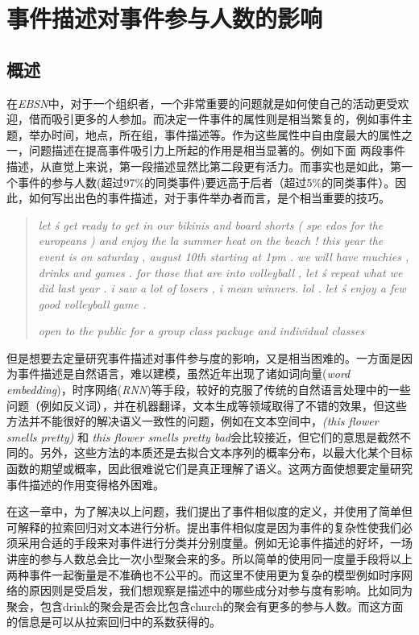 
%    
\section{事件描述对事件参与人数的影响} 
\subsection{概述}  
在\textit{EBSN}中，对于一个组织者，一个非常重要的问题就是如何使自己的活动更受欢迎，借而吸引更多的人参加。而决定一件事件的属性则是相当繁复的，例如事件主题，举办时间，地点，所在组，事件描述等。作为这些属性中自由度最大的属性之一，问题描述在提高事件吸引力上所起的作用是相当显著的。例如下面
两段事件描述，从直觉上来说，第一段描述显然比第二段更有活力。而事实也是如此，第一
个事件的参与人数(超过97\%的同类事件)要远高于后者（超过5\%的同类事件）。因此，如何写出出色的事件描述，对于事件举办者而言，是个相当重要的技巧。
 
\begin{quotation}
  \textit{let  \'s get ready to get in our bikinis and board shorts  (  spe
  edos for the europeans  )  and enjoy the la summer heat on the beach
  !  this year the event is on saturday  ,  august 10th starting at 
  1pm . we will have muchies  ,  drinks and games . for those that 
  are into volleyball  ,  let  \'s repeat what we did last year . 
  i saw a lot of losers  ,  i mean winners. lol . let  \'s enjoy 
  a few good volleyball game . \\ 
  }
    
  \textit{open to the public for a group class package and individual classes}
\end{quotation}

但是想要去定量研究事件描述对事件参与度的影响，又是相当困难的。一方面是因为事件描述是自然语言，难以建模，虽然近年出现了诸如词向量(\textit{word embedding})，时序网络(\textit{RNN})等手段，较好的克服了传统的自然语言处理中的一些问题（例如反义词），并在机器翻译，文本生成等领域取得了不错的效果，但这些方法并不能很好的解决语义一致性的问题，例如在文本空间中，\textit{(this flower smells pretty)} 和 \textit{this flower smells pretty bad}会比较接近，但它们的意思是截然不同的。另外，这些方法的本质还是去拟合文本序列的概率分布，以最大化某个目标函数的期望或概率，因此很难说它们是真正理解了语义。这两方面使想要定量研究事件描述的作用变得格外困难。

在这一章中，为了解决以上问题，我们提出了事件相似度的定义，并使用了简单但可解释的拉索回归对文本进行分析。提出事件相似度是因为事件的复杂性使我们必须采用合适的手段来对事件进行分类并分别度量。例如无论事件描述的好坏，一场讲座的参与人数总会比一次小型聚会来的多。所以简单的使用同一度量手段将以上两种事件一起衡量是不准确也不公平的。而这里不使用更为复杂的模型例如时序网络的原因则是受\cite{noauthor_predicting_nodate}启发，我们想观察是描述中的哪些成分对参与度有影响。比如同为聚会，包含drink的聚会是否会比包含church的聚会有更多的参与人数。而这方面的信息是可以从拉索回归中的系数获得的。

